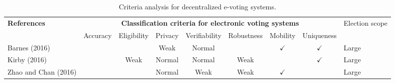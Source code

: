 \documentclass[../access.tex]{subfiles}
\begin{document}
\begin{table}[htbp]
    \caption{Criteria analysis for decentralized e-voting systems.}
    \begin{adjustwidth}{-1cm}{}
        \begin{tabular}{m{4.4cm} c c c c c c c >{\centering\arraybackslash}m{0.7cm}} %
            \toprule
            \multirow{3.5}{=}{\textbf{\footnotesize{References}}}               & \multicolumn{7}{c}{\textbf{\footnotesize{Classification criteria for electronic voting systems}}} & \multirow{3.5}{=}{\footnotesize{Election scope}}                                                                                                                                                                  \\
            \cline{2-8}
            \vspace{0.5cm}
            \multirow{2}{=}{}                                                   & \footnotesize{Accuracy}                                                                           & \footnotesize{Eligibility}                       & \footnotesize{Privacy} & \footnotesize{Verifiability} & \footnotesize{Robustness} & \footnotesize{Mobility} & \footnotesize{Uniqueness} & \multirow{2}{=}{}    \\
            \hline
            \footnotesize{Barnes (2016) \cite{Barnes2016}}                      & {}                                                                                                & {}                                               & {Weak}                 & {Normal}                     & {}                        & $ \checkmark $          & $ \checkmark $            & \footnotesize{Large} \\
            \hline
            \footnotesize{Kirby (2016) \cite{Kirby2016}}                        & {}                                                                                                & {Weak}                                           & {Normal}               & {Normal}                     & {Weak}                    & {}                      & $ \checkmark $            & \footnotesize{Large} \\
            \hline
            \footnotesize{Zhao and Chan (2016) \cite{Zhao2016}}                 & {}                                                                                                & {}                                               & {Normal}               & {Weak}                       & {Weak}                    & $ \checkmark $          & {}                        & \footnotesize{Large} \\

\end{tabular}
\end{adjustwidth}
\end{table}
\end{document}
